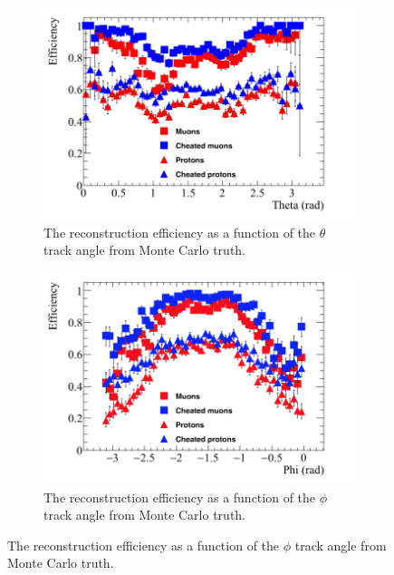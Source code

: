 \begin{figure}
\begin{subfigure}{0.48\textwidth}
        \centering
        \includegraphics[width=\textwidth]{Effic_SingSamps_Theta}
        \caption{The reconstruction efficiency as a function of the $\theta$ track angle from Monte Carlo truth.}
        \label{fig:Isol_Effic_Theta}
  \end{subfigure}%
  \hspace{0.03\textwidth}%
  \begin{subfigure}{0.48\textwidth}
        \centering
        \includegraphics[width=\textwidth]{Effic_SingSamps_Phi}
        \caption{The reconstruction efficiency as a function of the $\phi$ track angle from Monte Carlo truth.}
        \label{fig:Isol_Effic_Phi}
  \end{subfigure}

\end{figure}
